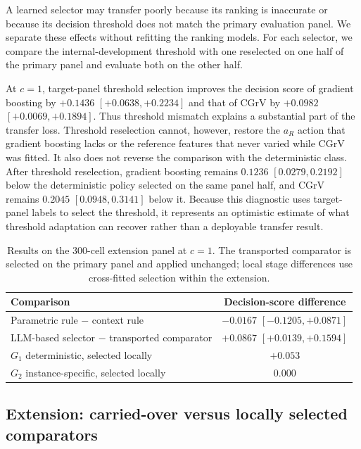 \documentclass[sigconf]{acmart}
\newcommand{\CGrV}{CGrV}
\newcommand{\ar}{a_R}
\begin{document}
A learned selector may transfer poorly because its ranking is inaccurate
or because its decision threshold does not match the primary evaluation panel.
We separate these effects without refitting the ranking models. 
For each selector, we compare the internal-development threshold with
one reselected on one half of the primary panel and evaluate both on the other half.

At $c{=}1$, target-panel threshold selection improves the decision
score of gradient boosting by $+0.1436$
$[+0.0638,\allowbreak +0.2234]$ and that of \CGrV{} by $+0.0982$
$[+0.0069,\allowbreak +0.1894]$. Thus threshold mismatch explains a
substantial part of the transfer loss. Threshold reselection cannot,
however, restore the $\ar$ action that gradient boosting lacks or the
reference features that never varied while \CGrV{} was fitted. It also
does not reverse the comparison with the deterministic class. After
threshold reselection, gradient boosting remains $0.1236$
$[0.0279,\allowbreak 0.2192]$ below the deterministic policy selected
on the same panel half, and \CGrV{} remains $0.2045$
$[0.0948,\allowbreak 0.3141]$ below it. Because this diagnostic uses
target-panel labels to select the threshold, it represents an
optimistic estimate of what threshold adaptation can recover rather
than a deployable transfer result.

\begin{table}[t]
\centering
\scriptsize
\setlength{\tabcolsep}{4pt}
\caption{Results on the $300$-cell extension panel at $c{=}1$.
The transported comparator is selected on the primary panel and applied
unchanged; local stage differences use cross-fitted selection within
the extension.}
\label{tab:extension}
\begin{tabular}{@{}lc@{}}
\toprule
Comparison & Decision-score difference \\
\midrule
Parametric rule $-$ context rule
& $-0.0167$ $[-0.1205,+0.0871]$ \\
LLM-based selector $-$ transported comparator
& $+0.0867$ $[+0.0139,+0.1594]$ \\
\midrule
$G_1$ deterministic, selected locally
& $+0.053$ \\
$G_2$ instance-specific, selected locally
& $0.000$ \\
\bottomrule
\end{tabular}
\end{table}

\subsection{Extension: carried-over versus locally selected comparators}
\label{sec:res-extension}
\end{document}
